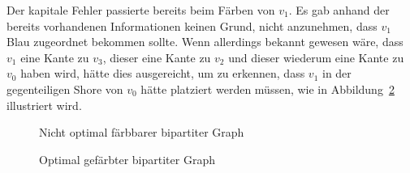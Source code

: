 \documentclass[11pt,abstracton]{scrreprt} %
\theoremstyle{definition}
\begin{document}
Der kapitale Fehler passierte bereits beim Färben von $v_1$. Es gab anhand der bereits vorhandenen Informationen keinen Grund, nicht anzunehmen, dass $v_1$ Blau zugeordnet bekommen sollte. Wenn allerdings bekannt gewesen wäre, dass $v_1$ eine Kante zu $v_3$, dieser eine Kante zu $v_2$ und dieser wiederum eine Kante zu $v_0$ haben wird, hätte dies ausgereicht, um zu erkennen, dass $v_1$ in der gegenteiligen Shore von $v_0$ hätte platziert werden müssen, wie in Abbildung~\ref{bipart.greedy.besser} illustriert wird.

\begin{figure}
\caption{Nicht optimal färbbarer bipartiter Graph}
\label{bipart.greedy}

\begin{center}


\end{center}

\end{figure}

\begin{figure}
\caption{Optimal gefärbter bipartiter Graph}
\label{bipart.greedy.besser}

\begin{center}


\end{center}

\end{figure}
\end{document}
